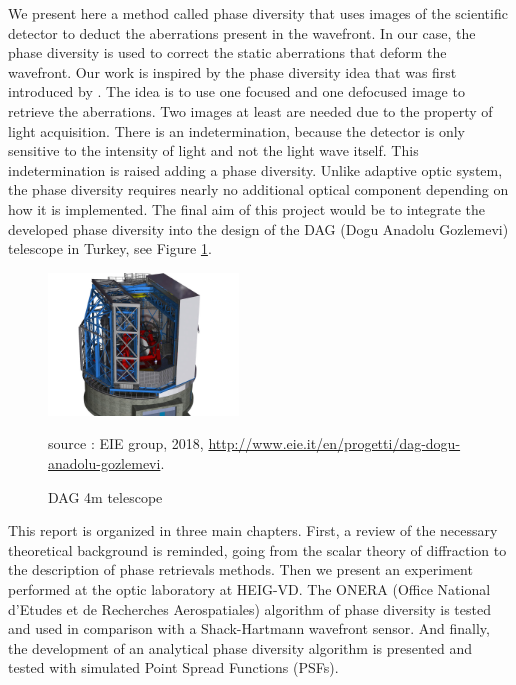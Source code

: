 We present here a method called phase diversity that uses images of the scientific detector to deduct the aberrations present in the wavefront. In our case, the phase diversity is used to correct the static aberrations that deform the wavefront. Our work is inspired by the phase diversity idea that was first introduced by \citet{Gonsalves_1982}. The idea is to use one focused and one defocused image to retrieve the aberrations. Two images at least are needed due to the property of light acquisition. There is an indetermination, because the detector is only sensitive to the intensity of light and not the light wave itself. This indetermination is raised adding a phase diversity. Unlike adaptive optic system, the phase diversity requires nearly no additional optical component depending on how it is implemented. The final aim of this project would be to integrate the developed phase diversity into the design of the DAG (Dogu Anadolu Gozlemevi) telescope in Turkey, see Figure \ref{fig:DAGtelescope}.

\begin{figure}
\begin{center}
\includegraphics[width=0.45\textwidth,angle=0]{Figures/DAGtelescope.jpg} \\
\caption{DAG 4m telescope} 
source : EIE group, 2018, \url{http://www.eie.it/en/progetti/dag-dogu-anadolu-gozlemevi}.
\label{fig:DAGtelescope}
\end{center}
\end{figure}

\vspace{1cm}

This report is organized in three main chapters. First, a review of the necessary theoretical background is reminded, going from the scalar theory of diffraction to the description of phase retrievals methods. Then we present an experiment performed at the optic laboratory at HEIG-VD. The ONERA (Office National d'Etudes et de Recherches Aerospatiales) algorithm of phase diversity is tested and used in comparison with a Shack-Hartmann wavefront sensor. And finally, the development of an analytical phase diversity algorithm is presented and tested with simulated Point Spread Functions (PSFs).